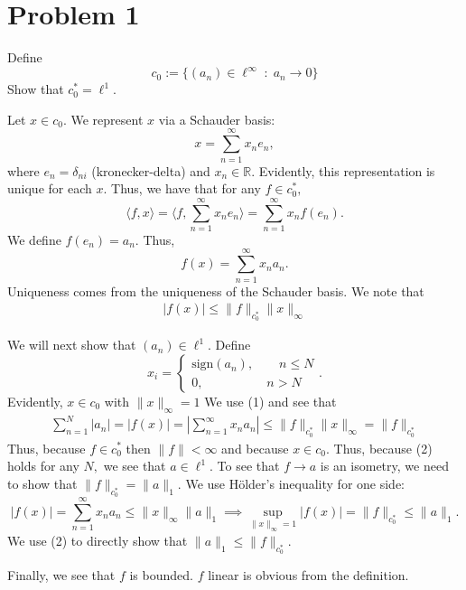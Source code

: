 \documentclass[11pt]{article}
\newcommand{\bbR}{\mathbb{R}}
\begin{document}
	
	
	\psetheader

\section*{Problem 1}
\begin{problem}
    Define 
    \[c_0 := \{(a_n)\in \ell^\infty \; : \; a_n \to 0\}\]
    Show that $c_0^* = \ell^1.$
\end{problem}
\begin{solution}
    Let $x\in c_0.$ We represent $x$ via a Schauder basis:
    \[x = \sum_{n=1}^\infty x_ne_n,\] where $e_n = \delta_{ni}$ (kronecker-delta) and $x_n \in \bbR.$ Evidently, this representation is unique for each $x.$
    Thus, we have that for any $f\in c_0^*,$ 
    \[\langle f, x\rangle = \langle f, \sum_{n=1}^\infty x_n e_n \rangle = \sum_{n=1}^\infty x_n f(e_n).\] We define $f(e_n)= a_n.$ Thus, 
    \[f(x) = \sum_{n=1}^\infty x_na_n.\] Uniqueness comes from the uniqueness of the Schauder basis. We note that 
    \begin{align}
        |f(x)| \leq \|f\|_{c_0^*}\|x\|_\infty
    \end{align}
   
    We will next show that $(a_n)\in \ell^1.$  Define 
    \[x_i = 
    \begin{cases}
        \text{sign}(a_n), \qquad n\leq N\\
        0, \qquad \qquad \quad n>N
    \end{cases}.\] Evidently, $x\in c_0$ with $\|x\|_\infty = 1$
    We use (1) and see that
    \begin{align}
      \sum_{n=1}^N |a_n| = |f(x)| = \left|\sum_{n=1}^\infty x_na_n\right| \leq \|f\|_{c_0^*}\|x\|_\infty  = \|f\|_{c_0^*}   
    \end{align}
        Thus, because $f\in c_0^*$ then $\|f\|< \infty$ and because $x\in c_0.$ Thus, because (2) holds for any $N,$ we see that $a\in \ell^1.$ To see that $f \to a$ is an isometry, we need to show that $\|f\|_{c_0^*} = \|a\|_1.$
    We use H\"older's inequality for one side:
    \[|f(x)| = \sum_{n=1}^\infty x_n a_n \leq \|x\|_\infty\|a\|_1 \implies \sup_{\|x\|_\infty =1}|f(x)| = \|f\|_{c_0^*} \leq \|a\|_1.\] We use (2) to directly show that $\|a\|_1 \leq \|f\|_{c_0^*}.$

    Finally, we see that $f$ is bounded. $f$ linear is obvious from the definition.
\end{solution}
\end{document}
